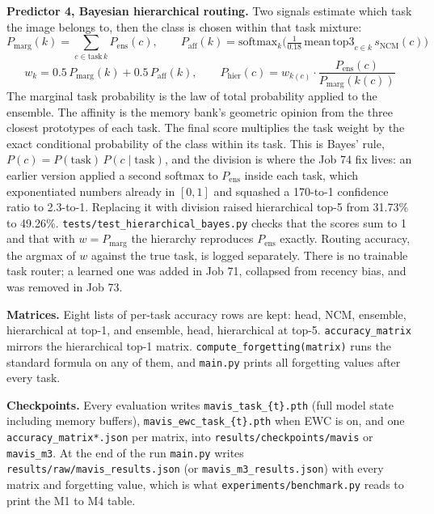 \documentclass[11pt,a4paper]{article}
\newcommand{\code}[1]{\texttt{#1}}
\begin{document}
\textbf{Predictor 4, Bayesian hierarchical routing.} Two signals estimate which task the image belongs to, then the class is chosen within that task mixture:
\begin{equation}
P_{\mathrm{marg}}(k) = \sum_{c \in \mathrm{task}\,k} P_{\mathrm{ens}}(c), \qquad P_{\mathrm{aff}}(k) = \mathrm{softmax}_k\!\Big(\tfrac{1}{0.18}\,\mathrm{mean\,top3}_{c \in k}\, s_{\mathrm{NCM}}(c)\Big)
\end{equation}
\begin{equation}
w_k = 0.5\, P_{\mathrm{marg}}(k) + 0.5\, P_{\mathrm{aff}}(k), \qquad P_{\mathrm{hier}}(c) = w_{k(c)} \cdot \frac{P_{\mathrm{ens}}(c)}{P_{\mathrm{marg}}(k(c))}
\end{equation}
The marginal task probability is the law of total probability applied to the ensemble. The affinity is the memory bank's geometric opinion from the three closest prototypes of each task. The final score multiplies the task weight by the exact conditional probability of the class within its task. This is Bayes' rule, $P(c) = P(\mathrm{task})\,P(c \mid \mathrm{task})$, and the division is where the Job 74 fix lives: an earlier version applied a second softmax to $P_{\mathrm{ens}}$ inside each task, which exponentiated numbers already in $[0, 1]$ and squashed a 170-to-1 confidence ratio to 2.3-to-1. Replacing it with division raised hierarchical top-5 from 31.73\% to 49.26\%. \code{tests/test\_hierarchical\_bayes.py} checks that the scores sum to 1 and that with $w = P_{\mathrm{marg}}$ the hierarchy reproduces $P_{\mathrm{ens}}$ exactly. Routing accuracy, the argmax of $w$ against the true task, is logged separately. There is no trainable task router; a learned one was added in Job 71, collapsed from recency bias, and was removed in Job 73.

\textbf{Matrices.} Eight lists of per-task accuracy rows are kept: head, NCM, ensemble, hierarchical at top-1, and ensemble, head, hierarchical at top-5. \code{accuracy\_matrix} mirrors the hierarchical top-1 matrix. \code{compute\_forgetting(matrix)} runs the standard formula on any of them, and \code{main.py} prints all forgetting values after every task.

\textbf{Checkpoints.} Every evaluation writes \code{mavis\_task\_\{t\}.pth} (full model state including memory buffers), \code{mavis\_ewc\_task\_\{t\}.pth} when EWC is on, and one \code{accuracy\_matrix*.json} per matrix, into \code{results/checkpoints/mavis} or \code{mavis\_m3}. At the end of the run \code{main.py} writes \code{results/raw/mavis\_results.json} (or \code{mavis\_m3\_results.json}) with every matrix and forgetting value, which is what \code{experiments/benchmark.py} reads to print the M1 to M4 table.
\end{document}
